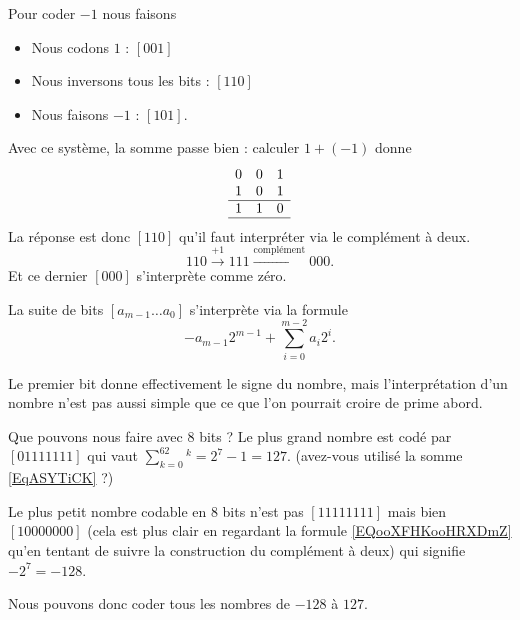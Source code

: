 \begin{example}
    Pour coder \( -1\) nous faisons
    \begin{itemize}
        \item Nous codons \( 1\) : \( [001]\)
        \item Nous inversons tous les bits : \( [110]\)
        \item Nous faisons \( -1\) : \( [101]\).
    \end{itemize}
\end{example}

Avec ce système, la somme passe bien : calculer \( 1+(-1)\) donne
    \begin{equation*}
        \begin{array}[]{ccc}
            0&0&1\\
            1&0&1\\
            \hline
            1&1&0\\
            \hline
        \end{array}
    \end{equation*}
La réponse est donc \( [110]\) qu'il faut interpréter via le complément à deux.
\begin{equation}
    110\stackrel{+1}{\longrightarrow}111\stackrel{\text{complément}}{\longrightarrow}000.
\end{equation}
Et ce dernier \( [000]\) s'interprète comme zéro.

\begin{definition}
    La suite de bits \( [a_{m-1}\ldots a_0]\) s'interprète via la formule
    \begin{equation}        \label{EQooXFHKooHRXDmZ}
        -a_{m-1}2^{m-1}+\sum_{i=0}^{m-2}a_i2^i.
    \end{equation}
\end{definition}

Le premier bit donne effectivement le signe du nombre, mais l'interprétation d'un nombre n'est pas aussi simple que ce que l'on pourrait croire de prime abord.

\begin{example}
    Que pouvons nous faire avec \( 8\) bits ? Le plus grand nombre est codé par \( [01111111]\) qui vaut \( \sum_{k=0}^62^k=2^7-1=127\). (avez-vous utilisé la somme \eqref{EqASYTiCK} ?)

    Le plus petit nombre codable en \( 8\) bits n'est pas \( [11111111]\) mais bien \( [10000000]\) (cela est plus clair en regardant la formule \eqref{EQooXFHKooHRXDmZ} qu'en tentant de suivre la construction du complément à deux) qui signifie \( -2^7=-128\).

    Nous pouvons donc coder tous les nombres de \( -128\) à \( 127\).
\end{example}

